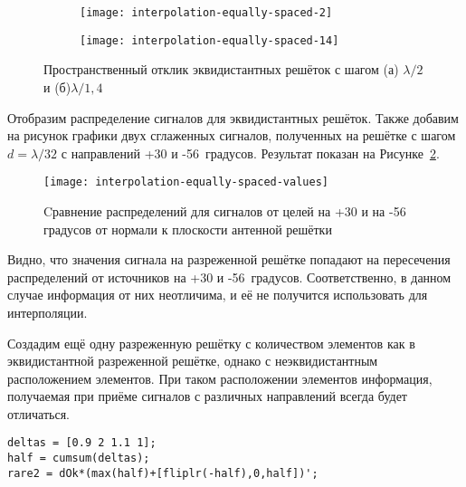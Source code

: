 \begin{figure}[H]
    \centering
    \begin{subfigure}[b]{0.49\textwidth}
        \centering
        \hspace*{-3ex}
        \texttt{[image: interpolation-equally-spaced-2]}
        \caption{}%
    \end{subfigure}
    \hfill
    \begin{subfigure}[b]{0.49\textwidth}
        \centering
        \hspace*{-3ex}
        \texttt{[image: interpolation-equally-spaced-14]}
        \caption{}%
    \end{subfigure}
    \caption{%
    Пространственный отклик эквидистантных решёток с шагом (а) $\lambda/2$ и (б)$\lambda/1,4$
    }%
    \label{fig:interpolation-equally-spaced-modeling}
\end{figure}

Отобразим распределение сигналов для эквидистантных решёток. Также добавим на рисунок графики двух 
сглаженных сигналов, полученных на решётке с шагом $d=\lambda/32$ с направлений +30 и -56~градусов. 
Результат показан на Рисунке~\ref{fig:interpolation-equally-spaced-values}. 

\begin{figure}[H]
    \centering
    \texttt{[image: interpolation-equally-spaced-values]}
    \caption{Cравнение распределений для сигналов от целей на +30 и на -56
    градусов от нормали к плоскости антенной решётки}
    \label{fig:interpolation-equally-spaced-values}
\end{figure}

Видно, что значения сигнала на разреженной решётке попадают на пересечения распределений от 
источников на +30 и -56~градусов. Соответственно, в данном случае информация от 
них неотличима, и её не получится использовать для интерполяции.

Создадим ещё одну разреженную решётку с количеством элементов как в эквидистантной разреженной решётке, 
однако с неэквидистантным расположением элементов. При таком расположении элементов информация, 
получаемая при приёме сигналов с различных направлений всегда будет отличаться.

\begin{verbatim}
deltas = [0.9 2 1.1 1];
half = cumsum(deltas);
rare2 = dOk*(max(half)+[fliplr(-half),0,half])';
\end{verbatim}

